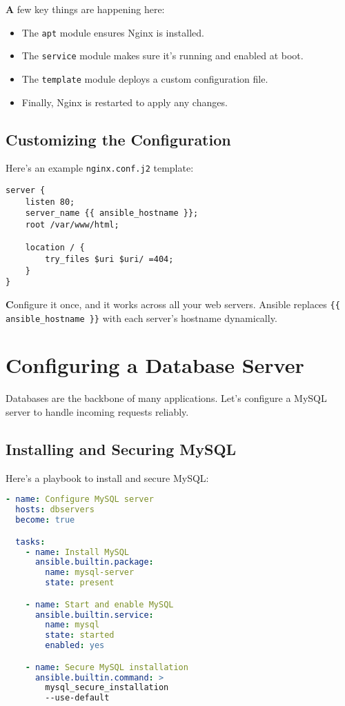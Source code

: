 \textbf{A} few key things are happening here:
\begin{itemize}
    \item The \texttt{apt} module ensures Nginx is installed.
    \item The \texttt{service} module makes sure it's running and enabled at boot.
    \item The \texttt{template} module deploys a custom configuration file.
    \item Finally, Nginx is restarted to apply any changes.
\end{itemize}

\subsection{Customizing the Configuration}

Here's an example \texttt{nginx.conf.j2} template:
\begin{lstlisting}[language=nginx, caption=Custom Nginx Configuration Template]
server {
    listen 80;
    server_name {{ ansible_hostname }};
    root /var/www/html;

    location / {
        try_files $uri $uri/ =404;
    }
}
\end{lstlisting}

\textbf{C}onfigure it once, and it works across all your web servers. Ansible replaces \texttt{\{\{ ansible\_hostname \}\}} with each server's hostname dynamically.


\section{Configuring a Database Server}

Databases are the backbone of many applications. Let's configure a MySQL server to handle incoming requests reliably.

\subsection{Installing and Securing MySQL}

Here's a playbook to install and secure MySQL:
\begin{lstlisting}[language=yaml, caption=Playbook for MySQL Server Configuration]
- name: Configure MySQL server
  hosts: dbservers
  become: true

  tasks:
    - name: Install MySQL
      ansible.builtin.package:
        name: mysql-server
        state: present

    - name: Start and enable MySQL
      ansible.builtin.service:
        name: mysql
        state: started
        enabled: yes

    - name: Secure MySQL installation
      ansible.builtin.command: >
        mysql_secure_installation
        --use-default
\end{lstlisting}


